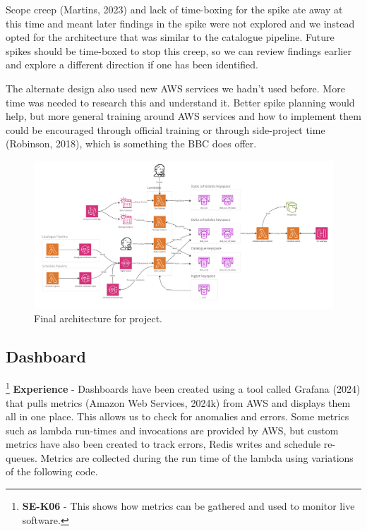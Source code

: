   Scope creep (Martins, 2023) and lack of time-boxing for the spike ate away at this time and meant later findings in the spike were not explored and we 
  instead opted for the architecture that was similar to the catalogue pipeline. Future spikes should be time-boxed to stop this creep, 
  so we can review findings earlier and explore a different direction if one has been identified.

  The alternate design also used new AWS services we hadn't used before. More time was needed to research this and understand it. Better spike planning 
  would help, but more general training around AWS services and how to implement them could be encouraged through official training or through side-project
  time (Robinson, 2018), which is something the BBC does offer.

  \begin{landscape}
    \begin{figure}[H]
      \centering
      \includegraphics[width=20cm]{assets/outputs/finalArchitecture.png}
      \caption{Final architecture for project.}
      \label{fig:finalArchitecture}
    \end{figure}
  \end{landscape}

  \newpage
  \subsection{Dashboard}

  \footnote{\textbf{SE-K06} - This shows how metrics can be gathered and used to monitor live software.}
  \textbf{Experience} - Dashboards have been created using a tool called Grafana (2024) that pulls metrics (Amazon Web Services, 2024k) from AWS and
  displays them all in one place. This allows us to check for anomalies and errors. Some metrics such as lambda run-times and invocations are provided by 
  AWS, but custom metrics have also been created to track errors, Redis writes and schedule re-queues. Metrics are collected during the run time of the 
  lambda using variations of the following code.

